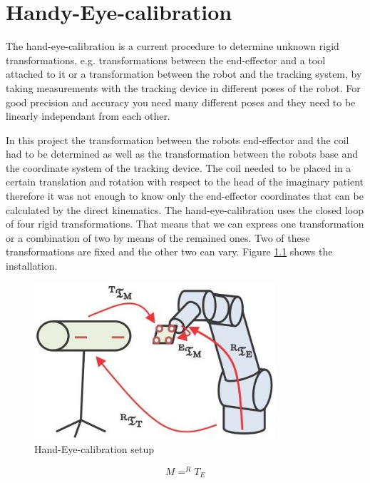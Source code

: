 \chapter{Handy-Eye-calibration}

The hand-eye-calibration is a current procedure to determine unknown rigid transformations, e.g. transformations between the end-effector and a tool attached to it or a transformation between the robot and the tracking system,
by taking measurements with the tracking device in different poses of the robot. For good precision and accuracy you need many different poses and they need to be linearly independant from each other. 

In this project the transformation between the robots end-effector and the coil had to be 
determined as well as the transformation between the robots base and the coordinate system of the tracking device. The coil needed to be placed in a certain translation and rotation with respect to the head of the imaginary patient therefore it was not enough to know only the end-effector coordinates that can be calculated by the direct kinematics. The hand-eye-calibration uses the closed loop of four rigid transformations. That means that we can express one transformation or a combination of two by means of the remained ones. Two of these transformations are fixed and the other two can vary. Figure \ref{handeye} shows the installation.

\begin{figure}[htbp]
	\centering 
	\captionsetup{format=plain}
		\includegraphics[width=0.8\textwidth]{handeye}		
			\caption{Hand-Eye-calibration setup} 
			\label{handeye} 
\end{figure}

\begin{equation}
	M = ^RT_E
\end{equation}

